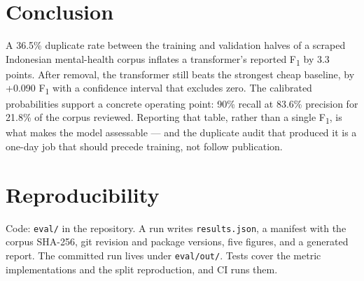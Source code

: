 \documentclass[10pt,a4paper]{article}
\newcommand{\fone}{F\textsubscript{1}}
\begin{document}
\section{Conclusion}

A 36.5\% duplicate rate between the training and validation halves of a scraped Indonesian
mental-health corpus inflates a transformer's reported \fone{} by 3.3 points. After removal, the
transformer still beats the strongest cheap baseline, by +0.090 \fone{} with a confidence interval
that excludes zero. The calibrated probabilities support a concrete operating point: 90\% recall at
83.6\% precision for 21.8\% of the corpus reviewed. Reporting that table, rather than a single
\fone{}, is what makes the model assessable --- and the duplicate audit that produced it is a
one-day job that should precede training, not follow publication.

\section*{Reproducibility}

Code: \texttt{eval/} in the repository. A run writes \texttt{results.json}, a manifest with the
corpus SHA-256, git revision and package versions, five figures, and a generated report. The
committed run lives under \texttt{eval/out/}. Tests cover the metric implementations and the
split reproduction, and CI runs them.
\end{document}
